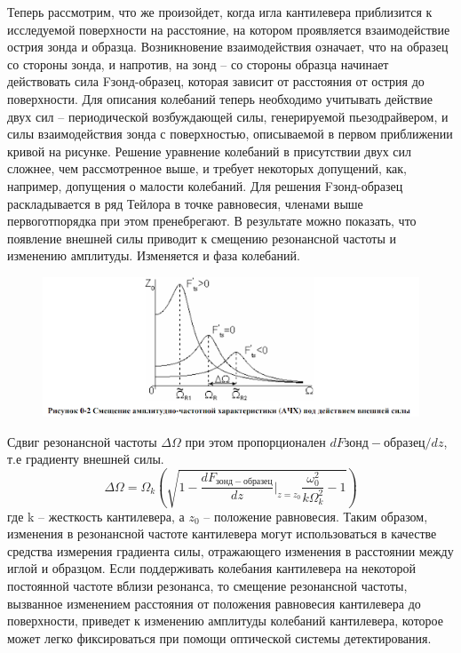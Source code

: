 \documentclass[a4paper,12pt]{article}
\theoremstyle{plain} %
\theoremstyle{definition} %
\theoremstyle{remark} %
\begin{document}
\begin{itemize}
Теперь рассмотрим, что же произойдет, когда игла кантилевера приблизится к исследуемой поверхности на расстояние, на котором проявляется взаимодействие острия зонда и образца. Возникновение взаимодействия означает, что на образец со стороны зонда, и напротив, на зонд – со стороны образца начинает действовать сила Fзонд-образец, которая зависит от расстояния от острия до поверхности. Для описания колебаний теперь необходимо учитывать действие двух сил – периодической возбуждающей силы,  генерируемой пьезодрайвером, и силы взаимодействия зонда с поверхностью,  описываемой в первом приближении кривой на рисунке. Решение уравнение колебаний в присутствии двух сил сложнее, чем рассмотренное выше, и требует некоторых допущений, как, например, допущения о малости колебаний. Для решения Fзонд-образец раскладывается в ряд Тейлора в точке равновесия, членами выше первоготпорядка при этом пренебрегают. В результате можно показать, что появление внешней силы приводит к смещению резонансной частоты и изменению амплитуды. Изменяется и фаза колебаний.
\begin{figure}[h!]
	\centering
	\includegraphics[scale=1]{pic11.png}
	\label{pic11}
\end{figure}
Сдвиг резонансной частоты $ \Delta\Omega $ при этом пропорционален $ dF{зонд-образец}/dz $, т.е градиенту внешней силы.
\begin{equation}\label{key}
	\Delta\Omega=\Omega_k\left( \sqrt{1-\frac{dF_{зонд-образец}}{dz}\bigg|_{z=z_0}\frac{\omega_0^2}{k\Omega^2_k}-1}\right) 
\end{equation}
где k – жесткость кантилевера, а $ z_0 $ – положение равновесия. Таким образом, изменения в резонансной частоте кантилевера могут использоваться в качестве средства измерения градиента силы, отражающего изменения в расстоянии между иглой и образцом. Если поддерживать колебания кантилевера на некоторой постоянной частоте вблизи резонанса, то смещение резонансной частоты, вызванное изменением расстояния от положения равновесия кантилевера до поверхности, приведет к изменению амплитуды колебаний кантилевера, которое может легко фиксироваться при помощи оптической системы детектирования. 

\end{itemize}
\end{document}

